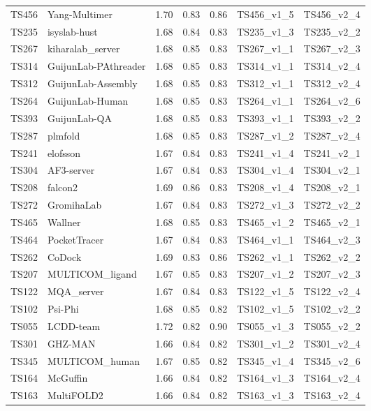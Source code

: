 \begin{longtable}{lllllll}
TS456 & Yang-Multimer & 1.70 & 0.83 & 0.86 & TS456\_v1\_5 & TS456\_v2\_4 \\ 
TS235 & isyslab-hust & 1.68 & 0.84 & 0.83 & TS235\_v1\_3 & TS235\_v2\_2 \\ 
TS267 & kiharalab\_server & 1.68 & 0.85 & 0.83 & TS267\_v1\_1 & TS267\_v2\_3 \\ 
TS314 & GuijunLab-PAthreader & 1.68 & 0.85 & 0.83 & TS314\_v1\_1 & TS314\_v2\_4 \\ 
TS312 & GuijunLab-Assembly & 1.68 & 0.85 & 0.83 & TS312\_v1\_1 & TS312\_v2\_4 \\ 
TS264 & GuijunLab-Human & 1.68 & 0.85 & 0.83 & TS264\_v1\_1 & TS264\_v2\_6 \\ 
TS393 & GuijunLab-QA & 1.68 & 0.85 & 0.83 & TS393\_v1\_1 & TS393\_v2\_2 \\ 
TS287 & plmfold & 1.68 & 0.85 & 0.83 & TS287\_v1\_2 & TS287\_v2\_4 \\ 
TS241 & elofsson & 1.67 & 0.84 & 0.83 & TS241\_v1\_4 & TS241\_v2\_1 \\ 
TS304 & AF3-server & 1.67 & 0.84 & 0.83 & TS304\_v1\_4 & TS304\_v2\_1 \\ 
TS208 & falcon2 & 1.69 & 0.86 & 0.83 & TS208\_v1\_4 & TS208\_v2\_1 \\ 
TS272 & GromihaLab & 1.67 & 0.84 & 0.83 & TS272\_v1\_3 & TS272\_v2\_2 \\ 
TS465 & Wallner & 1.68 & 0.85 & 0.83 & TS465\_v1\_2 & TS465\_v2\_1 \\ 
TS464 & PocketTracer & 1.67 & 0.84 & 0.83 & TS464\_v1\_1 & TS464\_v2\_3 \\ 
TS262 & CoDock & 1.69 & 0.83 & 0.86 & TS262\_v1\_1 & TS262\_v2\_2 \\ 
TS207 & MULTICOM\_ligand & 1.67 & 0.85 & 0.83 & TS207\_v1\_2 & TS207\_v2\_3 \\ 
TS122 & MQA\_server & 1.67 & 0.84 & 0.83 & TS122\_v1\_5 & TS122\_v2\_4 \\ 
TS102 & Psi-Phi & 1.68 & 0.85 & 0.82 & TS102\_v1\_5 & TS102\_v2\_2 \\ 
TS055 & LCDD-team & 1.72 & 0.82 & 0.90 & TS055\_v1\_3 & TS055\_v2\_2 \\ 
TS301 & GHZ-MAN & 1.66 & 0.84 & 0.82 & TS301\_v1\_2 & TS301\_v2\_4 \\ 
TS345 & MULTICOM\_human & 1.67 & 0.85 & 0.82 & TS345\_v1\_4 & TS345\_v2\_6 \\ 
TS164 & McGuffin & 1.66 & 0.84 & 0.82 & TS164\_v1\_3 & TS164\_v2\_4 \\ 
TS163 & MultiFOLD2 & 1.66 & 0.84 & 0.82 & TS163\_v1\_3 & TS163\_v2\_4 \\ 

\end{longtable}
